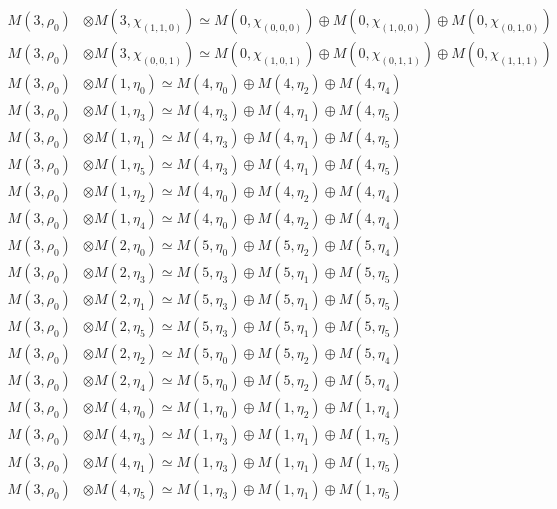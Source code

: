 \begin{align*}
M(3,\rho_{0}) &\otimes M(3,\chi_{(1,1,0)}) \simeq M(0,\chi_{(0,0,0)}) \oplus M(0,\chi_{(1,0,0)}) \oplus M(0,\chi_{(0,1,0)})\\
M(3,\rho_{0}) &\otimes M(3,\chi_{(0,0,1)}) \simeq M(0,\chi_{(1,0,1)}) \oplus M(0,\chi_{(0,1,1)}) \oplus M(0,\chi_{(1,1,1)})\\
M(3,\rho_{0}) &\otimes M(1,\eta_{0}) \simeq M(4,\eta_{0}) \oplus M(4,\eta_{2}) \oplus M(4,\eta_{4})\\
M(3,\rho_{0}) &\otimes M(1,\eta_{3}) \simeq M(4,\eta_{3}) \oplus M(4,\eta_{1}) \oplus M(4,\eta_{5})\\
M(3,\rho_{0}) &\otimes M(1,\eta_{1}) \simeq M(4,\eta_{3}) \oplus M(4,\eta_{1}) \oplus M(4,\eta_{5})\\
M(3,\rho_{0}) &\otimes M(1,\eta_{5}) \simeq M(4,\eta_{3}) \oplus M(4,\eta_{1}) \oplus M(4,\eta_{5})\\
M(3,\rho_{0}) &\otimes M(1,\eta_{2}) \simeq M(4,\eta_{0}) \oplus M(4,\eta_{2}) \oplus M(4,\eta_{4})\\
M(3,\rho_{0}) &\otimes M(1,\eta_{4}) \simeq M(4,\eta_{0}) \oplus M(4,\eta_{2}) \oplus M(4,\eta_{4})\\
M(3,\rho_{0}) &\otimes M(2,\eta_{0}) \simeq M(5,\eta_{0}) \oplus M(5,\eta_{2}) \oplus M(5,\eta_{4})\\
M(3,\rho_{0}) &\otimes M(2,\eta_{3}) \simeq M(5,\eta_{3}) \oplus M(5,\eta_{1}) \oplus M(5,\eta_{5})\\
M(3,\rho_{0}) &\otimes M(2,\eta_{1}) \simeq M(5,\eta_{3}) \oplus M(5,\eta_{1}) \oplus M(5,\eta_{5})\\
M(3,\rho_{0}) &\otimes M(2,\eta_{5}) \simeq M(5,\eta_{3}) \oplus M(5,\eta_{1}) \oplus M(5,\eta_{5})\\
M(3,\rho_{0}) &\otimes M(2,\eta_{2}) \simeq M(5,\eta_{0}) \oplus M(5,\eta_{2}) \oplus M(5,\eta_{4})\\
M(3,\rho_{0}) &\otimes M(2,\eta_{4}) \simeq M(5,\eta_{0}) \oplus M(5,\eta_{2}) \oplus M(5,\eta_{4})\\
M(3,\rho_{0}) &\otimes M(4,\eta_{0}) \simeq M(1,\eta_{0}) \oplus M(1,\eta_{2}) \oplus M(1,\eta_{4})\\
M(3,\rho_{0}) &\otimes M(4,\eta_{3}) \simeq M(1,\eta_{3}) \oplus M(1,\eta_{1}) \oplus M(1,\eta_{5})\\
M(3,\rho_{0}) &\otimes M(4,\eta_{1}) \simeq M(1,\eta_{3}) \oplus M(1,\eta_{1}) \oplus M(1,\eta_{5})\\
M(3,\rho_{0}) &\otimes M(4,\eta_{5}) \simeq M(1,\eta_{3}) \oplus M(1,\eta_{1}) \oplus M(1,\eta_{5})\\

\end{align*}
